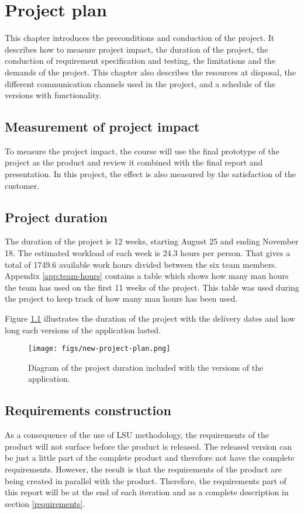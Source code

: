 \chapter{Project plan}
\label{chap:ProjectPlan}
This chapter introduces the preconditions and conduction of the project. It describes how to measure project impact, the duration of the project, the conduction of requirement specification and testing, the limitations and the demands of the project. This chapter also describes the resources at disposal, the different communication channels used in the project, and a schedule of the versions with functionality.

\section{Measurement of project impact}
To measure the project impact, the course will use the final prototype of the project as the product and review it combined with the final report and presentation. In this project, the effect is also measured by the satisfaction of the customer. 

\section{Project duration}
\label{duration}
The duration of the project is 12 weeks, starting August 25 and ending November 18. The estimated workload of each week is 24.3 hours per person. That gives a total of 1749.6 available work hours divided between the six team members. Appendix \ref{app:team-hours} contains a table which shows how many man hours the team has used on the first 11 weeks of the project. This table was used during the project to keep track of how many man hours has been used.

Figure \ref{fig:projectPlan} illustrates the duration of the project with the delivery dates and how long each versions of the application lasted.  


\begin{figure}
\centering
\texttt{[image: figs/new-project-plan.png]}
\caption{Diagram of the project duration included with the versions of the application.}
\label{fig:projectPlan}
\end{figure}

\section{Requirements construction}
As a consequence of the use of \gls{LSU} methodology, the requirements of the product will not surface before the product is released. The released version can be just a little part of the complete product and therefore not have the complete requirements. However, the result is that the requirements of the product are being created in parallel with the product. Therefore, the requirements part of this report will be at the end of each iteration and as a complete description in section \ref{requirements}. 

